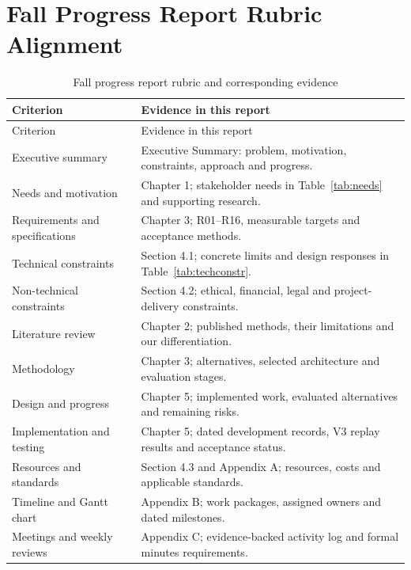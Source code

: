 \chapter{Fall Progress Report Rubric Alignment}\label{app:rubric}

\begingroup
\small
\setlength{\LTpre}{8pt}
\setlength{\LTpost}{4pt}
\renewcommand{\arraystretch}{1.02}
\begin{longtable}{L{3.9cm}L{8.4cm}}
\caption{Fall progress report rubric and corresponding evidence}\label{tab:rubric}\\
\toprule Criterion & Evidence in this report \\ \midrule\endfirsthead
\toprule Criterion & Evidence in this report \\ \midrule\endhead
Executive summary & Executive Summary: problem, motivation, constraints, approach and progress. \\
Needs and motivation & Chapter 1; stakeholder needs in Table~\ref{tab:needs} and supporting research. \\
Requirements and specifications & Chapter 3; R01--R16, measurable targets and acceptance methods. \\
Technical constraints & Section 4.1; concrete limits and design responses in Table~\ref{tab:techconstr}. \\
Non-technical constraints & Section 4.2; ethical, financial, legal and project-delivery constraints. \\
Literature review & Chapter 2; published methods, their limitations and our differentiation. \\
Methodology & Chapter 3; alternatives, selected architecture and evaluation stages. \\
Design and progress & Chapter 5; implemented work, evaluated alternatives and remaining risks. \\
Implementation and testing & Chapter 5; dated development records, V3 replay results and acceptance status. \\
Resources and standards & Section 4.3 and Appendix A; resources, costs and applicable standards. \\
Timeline and Gantt chart & Appendix B; work packages, assigned owners and dated milestones. \\
Meetings and weekly reviews & Appendix C; evidence-backed activity log and formal minutes requirements. \\
\bottomrule
\end{longtable}
\endgroup
